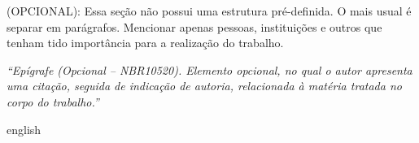 \documentclass[
	12pt,				%
	openright,			%
	oneside,			%
	a4paper,			%
	english,			%
	brazil				%
	]{abntex2}
\begin{document}
\begin{agradecimentos}
(OPCIONAL): Essa seção não possui uma estrutura pré-definida. O mais usual é separar em parágrafos. Mencionar apenas pessoas, instituições e outros que tenham tido importância para a realização do trabalho.

\end{agradecimentos}

\begin{epigrafe}
    \vspace*{\fill}
	\begin{flushright}
		\textit{``Epígrafe (Opcional – NBR10520). Elemento opcional, no qual o autor apresenta uma citação, seguida de indicação de autoria, relacionada à matéria tratada no corpo do trabalho.''}
	\end{flushright}
\end{epigrafe}


\setlength{\absparsep}{18pt} %
\begin{resumo}
	
\end{resumo}

\begin{resumo}[Abstract]
 \begin{otherlanguage*}{english}
	
 \end{otherlanguage*}
\end{resumo}



\tableofcontents*
\cleardoublepage



\textual









\end{document}
